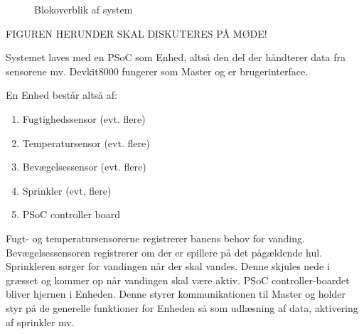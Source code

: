 \begin{figure}[ht] \centering
{}
\caption{Blokoverblik af system}
\label{fig:bloksystemoverblik}
\end{figure}

FIGUREN HERUNDER SKAL DISKUTERES PÅ MØDE!

Systemet laves med en PSoC som Enhed, altså den del der håndterer data fra sensorene mv.
Devkit8000 fungerer som Master og er brugerinterface.

En Enhed består altså af:
\begin{enumerate}
\item Fugtighedssensor (evt. flere)
\item Temperatursensor (evt. flere)
\item Bevægelsessensor (evt. flere)
\item Sprinkler (evt. flere)
\item PSoC controller board
\end{enumerate}

Fugt- og temperatursensorerne registrerer banens behov for vanding. Bevægelsessensoren registrerer om der er spillere på det pågældende hul. Sprinkleren sørger for vandingen når der skal vandes. Denne skjules nede i græsset og kommer op når vandingen skal være aktiv.
PSoC controller-boardet bliver hjernen i Enheden. Denne styrer kommunikationen til Master og holder styr på de generelle funktioner for Enheden så som udlæsning af data, aktivering af sprinkler mv.